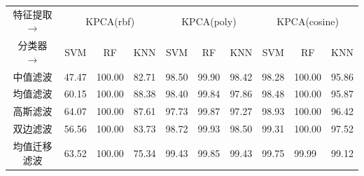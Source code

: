 \documentclass[12pt,hyperref,a4paper,UTF8]{ctexart}
\begin{document}
{\begin{table}[!h]
\begin{tabular}{@{}clllllllll@{}}
		\hline
		特征提取$\rightarrow$    & \multicolumn{3}{c}{KPCA(rbf)}                                              & \multicolumn{3}{c}{KPCA(poly)}                                             & \multicolumn{3}{c}{KPCA(cosine)}                                           \\
		分类器$\rightarrow$     & \multicolumn{1}{c}{SVM} & \multicolumn{1}{c}{RF} & \multicolumn{1}{c}{KNN} & \multicolumn{1}{c}{SVM} & \multicolumn{1}{c}{RF} & \multicolumn{1}{c}{KNN} & \multicolumn{1}{c}{SVM} & \multicolumn{1}{c}{RF} & \multicolumn{1}{c}{KNN} \\
		\hline
		中值滤波                 & 47.47                   & 100.00                 & 82.71                   & 98.50                   & 99.90                  & 98.42                   & 98.28                   & 100.00                 & 95.86                   \\
		均值滤波                 & 60.15                   & 100.00                 & 88.38                   & 98.40                   & 99.84                  & 97.86                   & 98.48                   & 100.00                 & 95.87                   \\
		高斯滤波                 & 64.07                   & 100.00                 & 87.61                   & 97.73                   & 99.87                  & 97.27                   & 98.93                   & 100.00                 & 96.42                   \\
		双边滤波                 & 56.56                   & 100.00                 & 83.73                   & 98.72                   & 99.93                  & 98.50                   & 99.31                   & 100.00                 & 97.52                   \\
		均值迁移滤波               & 63.52                   & 100.00                 & 75.34                   & 99.43                   & 99.85                  & 99.43                   & 99.75                   & 99.99                  & 99.12                  \\
		\hline
	\end{tabular}
\end{table}



}
\end{document}
